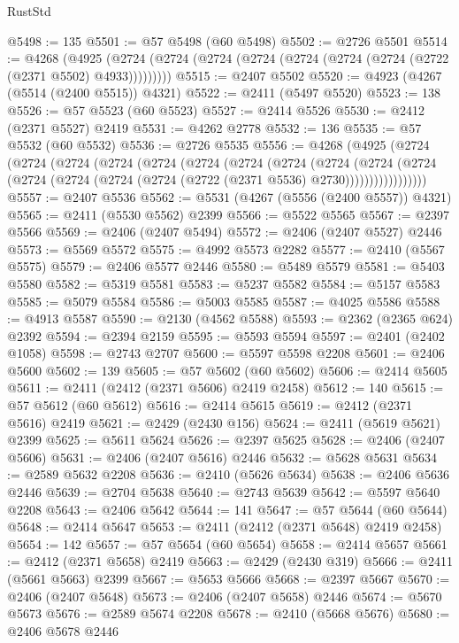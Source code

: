 \begin{lexlean}{RustStd}
\begin{coremodule}
@5498 := 135
@5501 := @57 @5498 (@60 @5498)
@5502 := @2726 @5501
@5514 := @4268
    (@4925 (@2724 (@2724 (@2724 (@2724 (@2724 (@2724 (@2724 (@2722 (@2371 @5502) @4933)))))))))
@5515 := @2407 @5502
@5520 := @4923 (@4267 (@5514 (@2400 @5515)) @4321)
@5522 := @2411 (@5497 @5520)
@5523 := 138
@5526 := @57 @5523 (@60 @5523)
@5527 := @2414 @5526
@5530 := @2412 (@2371 @5527) @2419
@5531 := @4262 @2778
@5532 := 136
@5535 := @57 @5532 (@60 @5532)
@5536 := @2726 @5535
@5556 := @4268
    (@4925
      (@2724
        (@2724
          (@2724
            (@2724
              (@2724
                (@2724
                  (@2724
                    (@2724
                      (@2724
                        (@2724
                          (@2724
                            (@2724 (@2724 (@2724 (@2724 (@2722 (@2371 @5536) @2730)))))))))))))))))
@5557 := @2407 @5536
@5562 := @5531 (@4267 (@5556 (@2400 @5557)) @4321)
@5565 := @2411 (@5530 @5562) @2399
@5566 := @5522 @5565
@5567 := @2397 @5566
@5569 := @2406 (@2407 @5494)
@5572 := @2406 (@2407 @5527) @2446
@5573 := @5569 @5572
@5575 := @4992 @5573 @2282
@5577 := @2410 (@5567 @5575)
@5579 := @2406 @5577 @2446
@5580 := @5489 @5579
@5581 := @5403 @5580
@5582 := @5319 @5581
@5583 := @5237 @5582
@5584 := @5157 @5583
@5585 := @5079 @5584
@5586 := @5003 @5585
@5587 := @4025 @5586
@5588 := @4913 @5587
@5590 := @2130 (@4562 @5588)
@5593 := @2362 (@2365 @624) @2392
@5594 := @2394 @2159
@5595 := @5593 @5594
@5597 := @2401 (@2402 @1058)
@5598 := @2743 @2707
@5600 := @5597 @5598 @2208
@5601 := @2406 @5600
@5602 := 139
@5605 := @57 @5602 (@60 @5602)
@5606 := @2414 @5605
@5611 := @2411 (@2412 (@2371 @5606) @2419 @2458)
@5612 := 140
@5615 := @57 @5612 (@60 @5612)
@5616 := @2414 @5615
@5619 := @2412 (@2371 @5616) @2419
@5621 := @2429 (@2430 @156)
@5624 := @2411 (@5619 @5621) @2399
@5625 := @5611 @5624
@5626 := @2397 @5625
@5628 := @2406 (@2407 @5606)
@5631 := @2406 (@2407 @5616) @2446
@5632 := @5628 @5631
@5634 := @2589 @5632 @2208
@5636 := @2410 (@5626 @5634)
@5638 := @2406 @5636 @2446
@5639 := @2704 @5638
@5640 := @2743 @5639
@5642 := @5597 @5640 @2208
@5643 := @2406 @5642
@5644 := 141
@5647 := @57 @5644 (@60 @5644)
@5648 := @2414 @5647
@5653 := @2411 (@2412 (@2371 @5648) @2419 @2458)
@5654 := 142
@5657 := @57 @5654 (@60 @5654)
@5658 := @2414 @5657
@5661 := @2412 (@2371 @5658) @2419
@5663 := @2429 (@2430 @319)
@5666 := @2411 (@5661 @5663) @2399
@5667 := @5653 @5666
@5668 := @2397 @5667
@5670 := @2406 (@2407 @5648)
@5673 := @2406 (@2407 @5658) @2446
@5674 := @5670 @5673
@5676 := @2589 @5674 @2208
@5678 := @2410 (@5668 @5676)
@5680 := @2406 @5678 @2446

\end{coremodule}
\end{lexlean}
